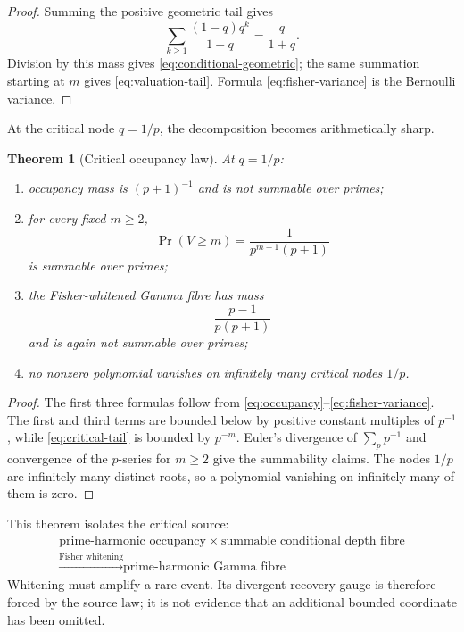 \documentclass[11pt]{article}
\newtheorem{theorem}{Theorem}[section]
\theoremstyle{definition}
\theoremstyle{remark}
\begin{document}
\begin{proof}
Summing the positive geometric tail gives
\[
 \sum_{k\geq1}\frac{(1-q)q^k}{1+q}=\frac q{1+q}.
\]
Division by this mass gives \eqref{eq:conditional-geometric}; the same summation starting at
\(m\) gives \eqref{eq:valuation-tail}.  Formula \eqref{eq:fisher-variance} is the Bernoulli
variance.
\end{proof}

At the critical node \(q=1/p\), the decomposition becomes arithmetically sharp.

\begin{theorem}[Critical occupancy law]\label{thm:critical-occupancy}
At \(q=1/p\):
\begin{enumerate}[label=\textup{(\roman*)}]
\item occupancy mass is \((p+1)^{-1}\) and is not summable over primes;
\item for every fixed \(m\geq2\),
\[
 \Pr(V\geq m)=\frac1{p^{m-1}(p+1)}
\tag{6.7}\label{eq:critical-tail}
\]
is summable over primes;
\item the Fisher-whitened Gamma fibre has mass
\[
 \frac{p-1}{p(p+1)}
\tag{6.8}\label{eq:gamma-fibre}
\]
and is again not summable over primes;
\item no nonzero polynomial vanishes on infinitely many critical nodes \(1/p\).
\end{enumerate}
\end{theorem}

\begin{proof}
The first three formulas follow from
\eqref{eq:occupancy}--\eqref{eq:fisher-variance}.  The first and third terms are bounded below
by positive constant multiples of \(p^{-1}\), while
\eqref{eq:critical-tail} is bounded by \(p^{-m}\).  Euler's divergence of
\(\sum_pp^{-1}\) and convergence of the \(p\)-series for \(m\geq2\) give the summability
claims.  The nodes \(1/p\) are infinitely many distinct roots, so a polynomial vanishing on
infinitely many of them is zero.
\end{proof}

This theorem isolates the critical source:
\[
 \boxed{\begin{gathered}
 \text{prime-harmonic occupancy}
 \ \times\
 \text{summable conditional depth fibre}\\
 \xrightarrow{\text{Fisher whitening}}
 \text{prime-harmonic Gamma fibre}
 \end{gathered}}
 \tag{6.9}\label{eq:source-box}
\]
Whitening must amplify a rare event.  Its divergent recovery gauge is therefore forced by the
source law; it is not evidence that an additional bounded coordinate has been omitted.
\end{document}
